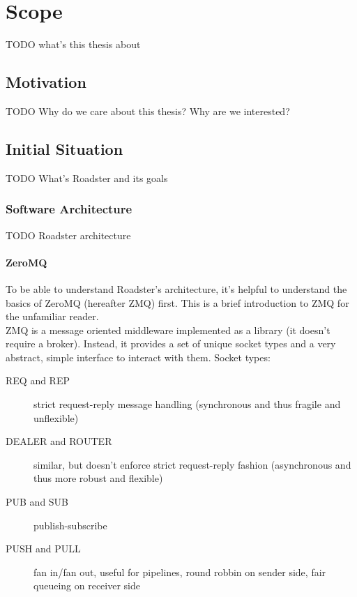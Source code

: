 \chapter{Scope}
TODO what's this thesis about

\section{Motivation}
TODO Why do we care about this thesis? Why are we interested?

\section{Initial Situation}
TODO What's Roadster and its goals

\subsection{Software Architecture}
TODO Roadster architecture\\

\subsubsection{ZeroMQ}
To be able to understand Roadster's architecture, it's helpful to understand
the basics of ZeroMQ (hereafter ZMQ) first. This is a brief introduction to ZMQ
for the unfamiliar reader.\\

ZMQ is a message oriented middleware implemented as a library (it doesn't
require a broker). Instead, it provides a set of unique socket types and a very
abstract, simple interface to interact with them. Socket types:\\

\begin{description}
	\item [REQ and REP] strict request-reply message handling (synchronous
		and thus fragile and unflexible)

	\item [DEALER and ROUTER] similar, but doesn't enforce strict
		request-reply fashion (asynchronous and thus more robust and
		flexible)

	\item [PUB and SUB] publish-subscribe

	\item [PUSH and PULL] fan in/fan out, useful for pipelines, round
		robbin on sender side, fair queueing on receiver side
\end{description}

